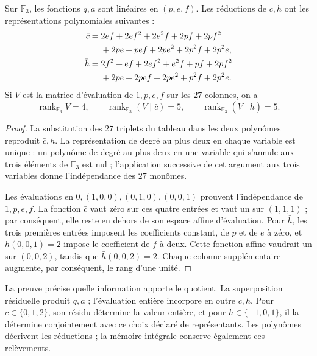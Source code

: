 \begin{theorem}
\label{carry27:rango}
Sur \(\mathbb F_3\), les fonctions \(q,a\) sont linéaires en
\((p,e,f)\). Les réductions de \(c,h\) ont les représentations polynomiales suivantes :
\begin{align}
\bar c={}&2ef+2ef^2+2e^2f+2pf+2pf^2\notag\\
 &+2pe+pef+2pe^2+2p^2f+2p^2e,
\label{carry27:polinomio-c}\\
\bar h={}&2f^2+ef+2ef^2+e^2f+pf+2pf^2\notag\\
 &+2pe+2pef+2pe^2+p^2f+2p^2e.
\label{carry27:polinomio-h}
\end{align}
Si \(V\) est la matrice d'évaluation de \(1,p,e,f\) sur les
\(27\) colonnes, on a
\[
\operatorname{rank}_{\mathbb F_3}V=4,\qquad
\operatorname{rank}_{\mathbb F_3}(V\mid\bar c)=5,\qquad
\operatorname{rank}_{\mathbb F_3}(V\mid\bar h)=5.
\]
\end{theorem}

\begin{proof}
La substitution des \(27\) triplets du tableau dans les deux
polynômes reproduit \(\bar c,\bar h\). La représentation de
degré au plus deux en chaque variable est unique : un polynôme de
degré au plus deux en une variable qui s'annule aux trois
éléments de \(\mathbb F_3\) est nul ; l'application successive
de cet argument aux trois variables donne l'indépendance
des \(27\) monômes.

Les évaluations en \(0,(1,0,0),(0,1,0),(0,0,1)\) prouvent
l'indépendance de \(1,p,e,f\). La fonction \(\bar c\) vaut
zéro sur ces quatre entrées et vaut un sur \((1,1,1)\) ;
par conséquent, elle reste en dehors de son espace affine d'évaluation.
Pour \(\bar h\), les trois premières entrées imposent les
coefficients constant, de \(p\) et de \(e\) à zéro, et
\(\bar h(0,0,1)=2\) impose le coefficient de \(f\) à deux.
Cette fonction affine vaudrait un sur \((0,0,2)\), tandis
que \(\bar h(0,0,2)=2\). Chaque colonne supplémentaire augmente,
par conséquent, le rang d'une unité.
\end{proof}

La preuve précise quelle information apporte le quotient. La superposition résiduelle produit \(q,a\) ; l'évaluation entière incorpore en outre \(c,h\). Pour \(c\in\{0,1,2\}\), son résidu détermine la valeur entière, et pour \(h\in\{-1,0,1\}\), il la détermine conjointement avec ce choix déclaré de représentants. Les polynômes décrivent les réductions ; la mémoire intégrale conserve également ces relèvements.


